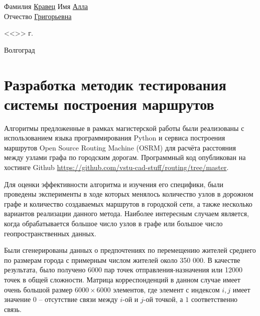 \documentclass[a4paper, 14pt]{extreport}
\begin{document}
\begin{titlepage}
\begin{flushleft}
            Фамилия \underline{Кравец\hspace{3.3cm}} Имя \underline{Алла\hspace{5.5cm}}\\
            Отчество \underline{Григорьевна\hspace{2.2cm}}
        \end{flushleft}
        \vspace{1.5cm}
        \begin{flushright}
            <<\underline{\hspace{1.0cm}}>>\underline{\hspace{4.0cm}} \the\year г.
        \end{flushright}
        \vspace{\fill}
        \begin{center}
            Волгоград \the\year
        \end{center}
    \end{titlepage}
    \tableofcontents
    \onehalfspacing

    \chapter{Разработка методик тестирования системы построения маршрутов}
    Алгоритмы предложенные в рамках магистерской работы были реализованы с использованием языка программирования 
    Python и сервиса построения маршрутов Open Source Routing Machine (OSRM) для расчёта расстояния между узлами графа 
    по городским дорогам. Программный код опубликован на хостинге Github 
    \url{https://github.com/vstu-cad-stuff/routing/tree/master}.

    Для оценки эффективности алгоритма и изучения его специфики, были проведены эксперименты в ходе которых менялось 
    количество узлов в дорожном графе и количество создаваемых маршрутов в городской сети, а также несколько вариантов 
    реализации данного метода. Наиболее интересным случаем является, когда обрабатывается большое число узлов в графе 
    или большое число геопространственных данных.

    Были сгенерированы данных о предпочтениях по перемещению жителей среднего по размерам города с примерным числом 
    жителей около 350 000. В качестве результата, было получено 6000 пар точек отправления-назначения или 12000 точек в 
    общей сложности. Матрица корреспонденций в данном случае имеет очень большой размер \( 6000 \times 6000 \) 
    элементов, где элемент с индексом \( i, j \) имеет значение \( 0 \) -- отсутствие связи между \( i \)-ой и 
    \( j \)-ой точкой, а \( 1 \) соответственно связь.
\end{document}
